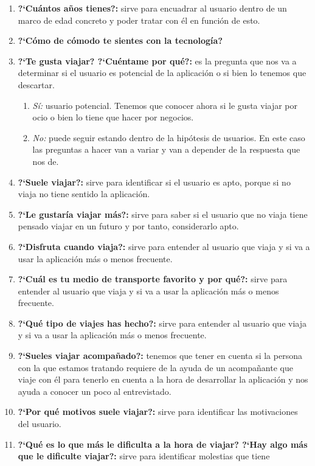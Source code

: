 \begin{enumerate}
    \item {\textbf{?`Cuántos años tienes?:}} sirve para encuadrar al usuario dentro de un marco de edad concreto y poder tratar con él en función de esto.
    \item {\textbf{?`Cómo de cómodo te sientes con la tecnología?}}
    \item {\textbf{?`Te gusta viajar? ?`Cuéntame por qué?:}} es la pregunta que nos va a determinar si el usuario es potencial de la aplicación
                o si bien lo tenemos que descartar.
    \begin{enumerate}
        \item {\textit{Sí:}} usuario potencial. Tenemos que conocer ahora si le gusta viajar por ocio o bien lo tiene que hacer por negocios.
        \item {\textit{No:}} puede seguir estando dentro de la hipótesis de usuarios. En este caso las preguntas a hacer van a variar y van a
                        depender de la respuesta que nos de.
    \end{enumerate}
    \item {\textbf{?`Suele viajar?:}} sirve para identificar si el usuario es apto, porque si no viaja no tiene sentido la aplicación.
    \item {\textbf{?`Le gustaría viajar más?:}} sirve para saber si el usuario que no viaja tiene pensado viajar en un futuro y por tanto, considerarlo apto.
    \item {\textbf{?`Disfruta cuando viaja?:}} sirve para entender al usuario que viaja y si va a usar la aplicación más o menos frecuente.
    \item {\textbf{?`Cuál es tu medio de transporte favorito y por qué?:}} sirve para entender al usuario que viaja y si va a usar la aplicación más o menos frecuente.
    \item {\textbf{?`Qué tipo de viajes has hecho?:}} sirve para entender al usuario que viaja y si va a usar la aplicación más o menos frecuente.
    \item {\textbf{?`Sueles viajar acompañado?:}} tenemos que tener en cuenta si la persona con la que estamos tratando requiere de la
                ayuda de un acompañante que viaje con él para tenerlo en cuenta a la hora de desarrollar la aplicación y nos ayuda a conocer un poco al entrevistado.
    \item {\textbf{?`Por qué motivos suele viajar?:}} sirve para identificar las motivaciones del usuario.
    \item {\textbf{?`Qué es lo que más le dificulta a la hora de viajar? ?`Hay algo más que le dificulte viajar?:}} sirve para identificar molestias que tiene

\end{enumerate}
